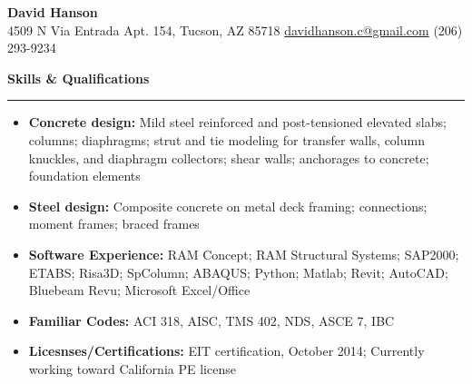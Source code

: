 \documentclass[letterpaper,6pt]{article}
\begin{document}
\begin{center}
{\Large \textbf{David Hanson}}\\
    4509 N Via Entrada Apt. 154, Tucson, AZ 85718 \textbar{}
         \href{mailto:davidhanson.c@gmail.com}{davidhanson.c@gmail.com} \textbar{} 
         (206) 293-9234
\end{center}

{\large \textbf{Skills \& Qualifications}}
\hrule
\vspace{2mm}
\begin{itemize}[noitemsep,topsep=0pt]
    \item  \textbf{Concrete design:} Mild steel reinforced and post-tensioned elevated slabs; columns; diaphragms; strut and tie modeling for transfer walls, column knuckles, and diaphragm collectors; shear walls; anchorages to concrete; foundation elements
    \item  \textbf{Steel design:} Composite concrete on metal deck framing; connections; moment frames; braced frames
    \item  \textbf{Software Experience:} RAM Concept; RAM Structural Systems; SAP2000; ETABS; Risa3D; SpColumn; ABAQUS; Python; Matlab; Revit; AutoCAD; Bluebeam Revu; Microsoft Excel/Office
    \item  \textbf{Familiar Codes:} ACI 318, AISC, TMS 402, NDS, ASCE 7, IBC
    \item  \textbf{Licesnses/Certifications:} EIT certification, October 2014; Currently working toward California PE license
\end{itemize}
\vspace{5mm}
\end{document}

